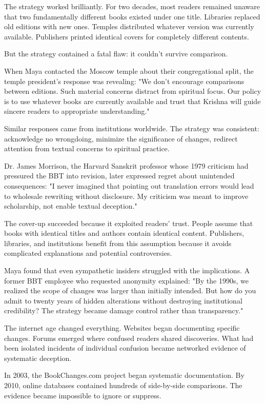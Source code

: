\documentclass[11pt,twoside]{book}
\begin{document}
The strategy worked brilliantly. For two decades, most readers remained unaware that two fundamentally different books existed under one title. Libraries replaced old editions with new ones. Temples distributed whatever version was currently available. Publishers printed identical covers for completely different contents.

But the strategy contained a fatal flaw: it couldn't survive comparison.

When Maya contacted the Moscow temple about their congregational split, the temple president's response was revealing: "We don't encourage comparisons between editions. Such material concerns distract from spiritual focus. Our policy is to use whatever books are currently available and trust that Krishna will guide sincere readers to appropriate understanding."

Similar responses came from institutions worldwide. The strategy was consistent: acknowledge no wrongdoing, minimize the significance of changes, redirect attention from textual concerns to spiritual practice.

Dr. James Morrison, the Harvard Sanskrit professor whose 1979 criticism had pressured the BBT into revision, later expressed regret about unintended consequences: "I never imagined that pointing out translation errors would lead to wholesale rewriting without disclosure. My criticism was meant to improve scholarship, not enable textual deception."

The cover-up succeeded because it exploited readers' trust. People assume that books with identical titles and authors contain identical content. Publishers, libraries, and institutions benefit from this assumption because it avoids complicated explanations and potential controversies.

Maya found that even sympathetic insiders struggled with the implications. A former BBT employee who requested anonymity explained: "By the 1990s, we realized the scope of changes was larger than initially intended. But how do you admit to twenty years of hidden alterations without destroying institutional credibility? The strategy became damage control rather than transparency."

The internet age changed everything. Websites began documenting specific changes. Forums emerged where confused readers shared discoveries. What had been isolated incidents of individual confusion became networked evidence of systematic deception.

In 2003, the BookChanges.com project began systematic documentation. By 2010, online databases contained hundreds of side-by-side comparisons. The evidence became impossible to ignore or suppress.
\end{document}
